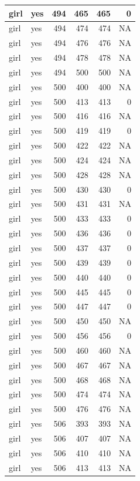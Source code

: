 \documentclass[man]{apa6}
\begin{document}
\begin{tabular}{l|l|r|r|r|r}
\hline
girl & yes & 494 & 465 & 465 & 0\\
\hline
girl & yes & 494 & 474 & 474 & NA\\
\hline
girl & yes & 494 & 476 & 476 & NA\\
\hline
girl & yes & 494 & 478 & 478 & NA\\
\hline
girl & yes & 494 & 500 & 500 & NA\\
\hline
girl & yes & 500 & 400 & 400 & NA\\
\hline
girl & yes & 500 & 413 & 413 & 0\\
\hline
girl & yes & 500 & 416 & 416 & NA\\
\hline
girl & yes & 500 & 419 & 419 & 0\\
\hline
girl & yes & 500 & 422 & 422 & NA\\
\hline
girl & yes & 500 & 424 & 424 & NA\\
\hline
girl & yes & 500 & 428 & 428 & NA\\
\hline
girl & yes & 500 & 430 & 430 & 0\\
\hline
girl & yes & 500 & 431 & 431 & NA\\
\hline
girl & yes & 500 & 433 & 433 & 0\\
\hline
girl & yes & 500 & 436 & 436 & 0\\
\hline
girl & yes & 500 & 437 & 437 & 0\\
\hline
girl & yes & 500 & 439 & 439 & 0\\
\hline
girl & yes & 500 & 440 & 440 & 0\\
\hline
girl & yes & 500 & 445 & 445 & 0\\
\hline
girl & yes & 500 & 447 & 447 & 0\\
\hline
girl & yes & 500 & 450 & 450 & NA\\
\hline
girl & yes & 500 & 456 & 456 & 0\\
\hline
girl & yes & 500 & 460 & 460 & NA\\
\hline
girl & yes & 500 & 467 & 467 & NA\\
\hline
girl & yes & 500 & 468 & 468 & NA\\
\hline
girl & yes & 500 & 474 & 474 & NA\\
\hline
girl & yes & 500 & 476 & 476 & NA\\
\hline
girl & yes & 506 & 393 & 393 & NA\\
\hline
girl & yes & 506 & 407 & 407 & NA\\
\hline
girl & yes & 506 & 410 & 410 & NA\\
\hline
girl & yes & 506 & 413 & 413 & NA\\

\end{tabular}
\end{document}
